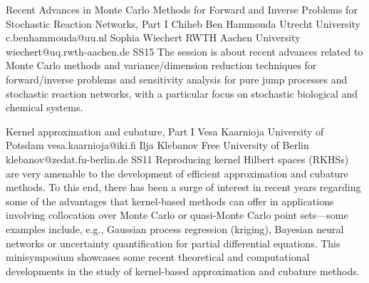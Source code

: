 \documentclass[12pt,a4paper,figuresright]{book}
\begin{document}


%


\clearpage

\begin{session}
 {Recent Advances in Monte Carlo Methods for Forward and Inverse Problems for Stochastic Reaction Networks, Part I}%
 {Chiheb Ben Hammouda}%
 {Utrecht University}%
 {c.benhammouda@uu.nl}%
 {Sophia Wiechert}%
 {RWTH Aachen University}%
 {wiechert@uq.rwth-aachen.de}%
 {SS15}
 {}%
The session is about recent advances related to Monte Carlo methods and variance/dimension reduction techniques for forward/inverse problems and sensitivity analysis for pure jump processes and stochastic reaction networks, with a particular focus on stochastic biological and chemical systems.
\end{session}



%


\clearpage

\begin{session}
 {Kernel approximation and cubature, Part I}%
 {Vesa Kaarnioja}%
 {University of Potsdam}%
 {vesa.kaarnioja@iki.fi}%
 {Ilja Klebanov}%
 {Free University of Berlin}%
 {klebanov@zedat.fu-berlin.de}%
 {SS11}
 {}%
 Reproducing kernel Hilbert spaces (RKHSs) are very amenable to the development of efficient approximation and cubature methods. To this end, there has been a surge of interest in recent years regarding some of the advantages that kernel-based methods can offer in applications involving collocation over Monte Carlo or quasi-Monte Carlo point sets---some examples include, e.g., Gaussian process regression (kriging), Bayesian neural networks or uncertainty quantification for partial differential equations. This minisymposium showcases some recent theoretical and computational developments in the study of kernel-based approximation and cubature methods.
\end{session}
\end{document}
